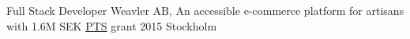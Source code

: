 {Full Stack Developer}
{Weavler AB, An accessible e-commerce platform for artisans with 1.6M SEK \href{https://pts.se}{PTS} grant 2015}
{Stockholm \Large{}}{}
{
}
